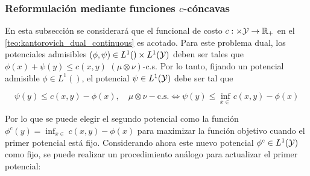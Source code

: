 






\subsubsection{Reformulación mediante funciones \texorpdfstring{$c$}{c}-cóncavas}

En esta subsección se considerará que el funcional de costo $c:\times\mathcal{Y}\to\mathbb{R}_+$ en el \autoref{teo:kantorovich_dual_continuous} es acotado. Para este problema dual, los potenciales admisibles $(\phi,\psi)\in L^1()\times L^1(\mathcal{Y})$ deben ser tales que $\phi(x) + \psi(y) \leq c(x,y)$ $(\mu\otimes\nu)$-c.s. Por lo tanto, fijando un potencial admisible $\phi\in L^1(\xspace)$, el potencial $\psi\in L^1(\mathcal{Y})$ debe ser tal que

\begin{equation}
	\psi(y) \leq c(x,y) - \phi(x), \quad \mu\otimes\nu-\text{c.s.}
	\iff
	\psi(y) \leq \inf_{x\in\xspace} c(x,y) - \phi(x)
\end{equation}

Por lo que se puede elegir el segundo potencial como la función $\phi^c(y) = \inf_{x\in\xspace} c(x,y) - \phi(x)$ para maximizar la función objetivo cuando el primer potencial está fijo. Considerando ahora este nuevo potencial $\phi^c\in L^1(\mathcal{Y})$ como fijo, se puede realizar un procedimiento análogo para actualizar el primer potencial:

